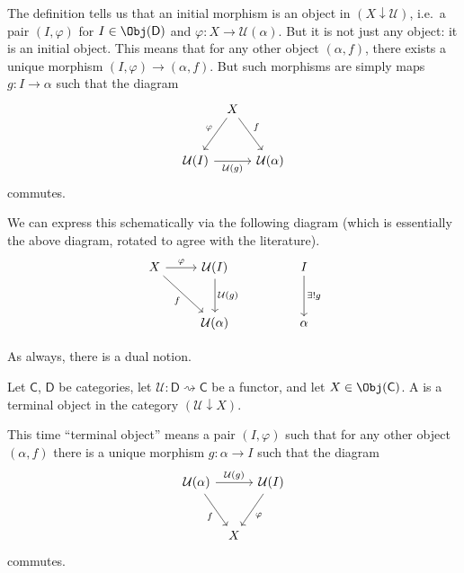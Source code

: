 \documentclass[notes.tex]{subfiles}
\begin{document}
The definition tells us that an initial morphism is an object in $(X \downarrow \mathcal{U})$, i.e.\ a pair $(I, \varphi)$ for $I \in \Obj(\mathsf{D})$ and $\varphi\colon X \to \mathcal{U}(\alpha)$. But it is not just any object: it is an initial object. This means that for any other object $(\alpha, f)$, there exists a unique morphism $(I, \varphi) \to (\alpha, f)$.
But such morphisms are simply maps $g\colon I \to \alpha$ such that the diagram
\begin{equation*}
  \begin{tikzcd}[column sep=tiny, row sep=6ex]
    & X \arrow[dl, swap, "\varphi"] \arrow[dr, "f"] & \\
    \mathcal{U}(I) \arrow[rr, swap, "\mathcal{U}(g)"] & & \mathcal{U}(\alpha)
  \end{tikzcd}
\end{equation*}
commutes.

We can express this schematically via the following diagram (which is essentially the above diagram, rotated to agree with the literature).
\begin{equation*}
  \begin{tikzcd}[row sep=large]
    X \arrow[r, "\varphi"] \arrow[dr, swap, "f"] & \mathcal{U}(I) \arrow[d, "\mathcal{U}(g)"] & & I \arrow[d, "\exists!g"]\\
    & \mathcal{U}(\alpha) & & \alpha
  \end{tikzcd}
\end{equation*}

As always, there is a dual notion.
\begin{definition}
  \label{def:terminalmorphism}
  Let $\mathsf{C}$, $\mathsf{D}$ be categories, let $\mathcal{U}\colon \mathsf{D} \rightsquigarrow \mathsf{C}$ be a functor, and let $X \in \Obj(\mathsf{C})$. A  is a terminal object in the category $(\mathcal{U} \downarrow X)$.
\end{definition}

This time ``terminal object'' means a pair $(I, \varphi)$ such that for any other object $(\alpha, f)$ there is a unique morphism $g\colon \alpha \to I$ such that the diagram
\begin{equation*}
  \begin{tikzcd}[column sep=tiny, row sep=6ex]
    \mathcal{U}(\alpha) \arrow[dr, swap, "f"] \arrow[rr, "\mathcal{U}(g)"] & & \mathcal{U}(I)\arrow[dl, "\varphi"] \\
    & X
  \end{tikzcd}
\end{equation*}
commutes.
\end{document}
